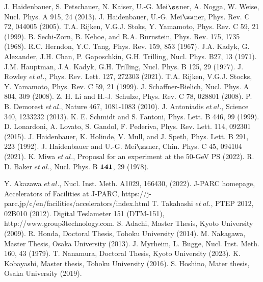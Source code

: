 \begin{thebibliography}{99}
J. Haidenbauer, S. Petschauer, N. Kaiser, U.-G. Mei$\ss$ner, A. Nogga, W. Weise, Nucl. Phys. A 915, 24 (2013).
J. Haidenbauer, U.-G. Mei$\ss$ner, Phys. Rev. C 72, 044005 (2005).
T.A. Rijken, V.G.J. Stoks, Y. Yamamoto, Phys. Rev. C 59, 21 (1999).
B. Sechi-Zorn, B. Kehoe, and R.A. Burnstein, Phys. Rev. 175, 1735 (1968).
R.C. Herndon, Y.C. Tang, Phys. Rev. 159, 853 (1967).
J.A. Kadyk, G. Alexander, J.H. Chan, P. Gaposchkin, G.H. Trilling, Nucl. Phys. B27, 13 (1971).
J.M. Hauptman, J.A. Kadyk, G.H. Trilling, Nucl. Phys. B 125, 29 (1977).
J. Rowley $et\ al.$, Phys. Rev. Lett. 127, 272303 (2021).
T.A. Rijken, V.G.J. Stocks, Y. Yamamoto, Phys. Rev. C 59, 21 (1999).
J. Schaffner-Bielich, Nucl. Phys. A 804, 309 (2008).
Z. H. Li and H.-J. Schulze, Phys. Rev. C 78, 028801 (2008).
P. B. Demorest $et\ al.$, Nature 467, 1081-1083 (2010).
J. Antoniadis $et\ al.$, Science 340, 1233232 (2013).
K. E. Schmidt and S. Fantoni, Phys. Lett. B 446, 99 (1999).
D. Lonardoni, A. Lovato, S. Gandol, F. Pederiva, Phys. Rev. Lett. 114, 092301 (2015).
J. Haidenbauer, K. Holinde, V. Mull, and J. Speth, Phys. Lett. B 291, 223 (1992).
J. Haidenbauer and U.-G. Mei$\ss$ner, Chin. Phys. C 45, 094104 (2021).
K. Miwa $et\ al.$, Proposal for an experiment at the 50-GeV PS (2022).
R. D. Baker $et\ al.$, Nucl. Phys. B $\bf{141}$, 29 (1978).


Y. Akazawa $et\ al.$, Nucl. Inst. Meth. A1029, 166430, (2022).
J-PARC homepage, Accelerators of Facilities at J-PARC, https://j-parc.jp/c/en/facilities/accelerators/index.html
T. Takahashi $et\ al.$, PTEP 2012, 02B010 (2012).
Digital Teslameter 151 (DTM-151), http://www.group3technology.com.
S. Adachi, Master Thesis, Kyoto University (2009).
R. Honda, Doctoral Thesis, Tohoku University (2014).
M. Nakagawa, Master Thesis, Osaka University (2013).
J. Myrheim, L. Bugge, Nucl. Inst. Meth. 160, 43 (1979).
T. Nanamura, Doctoral Thesis, Kyoto University (2023).
K. Kobayashi, Master thesis, Tohoku University (2016).
S. Hoshino, Mater thesis, Osaka University (2019).


\end{thebibliography}
